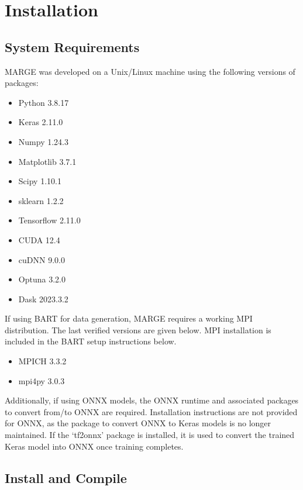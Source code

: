 \documentclass[letterpaper, 12pt]{article}
\begin{document}
\section{Installation}
\label{sec:installation}

\subsection{System Requirements}
\label{sec:requirements}

\noindent MARGE was developed on a Unix/Linux machine using the following 
versions of packages:

\begin{itemize}
\item Python 3.8.17
\item Keras 2.11.0
\item Numpy 1.24.3
\item Matplotlib 3.7.1
\item Scipy 1.10.1
\item sklearn 1.2.2
\item Tensorflow 2.11.0
\item CUDA 12.4
\item cuDNN 9.0.0
\item Optuna 3.2.0
\item Dask 2023.3.2
\end{itemize}

\noindent If using BART for data generation, MARGE requires a working MPI 
distribution.  The last verified versions are given below.  MPI installation is 
included in the BART setup instructions below.

\begin{itemize}
	\item MPICH 3.3.2
	\item mpi4py 3.0.3
\end{itemize}

Additionally, if using ONNX models, the ONNX runtime and 
associated packages to convert from/to ONNX are required.  
Installation instructions are not provided for ONNX, as the 
package to convert ONNX to Keras models is no longer 
maintained.  If the `tf2onnx' package is installed, it is used 
to convert the trained Keras model into ONNX once training 
completes.


\subsection{Install and Compile}
\label{sec:install}
\end{document}
